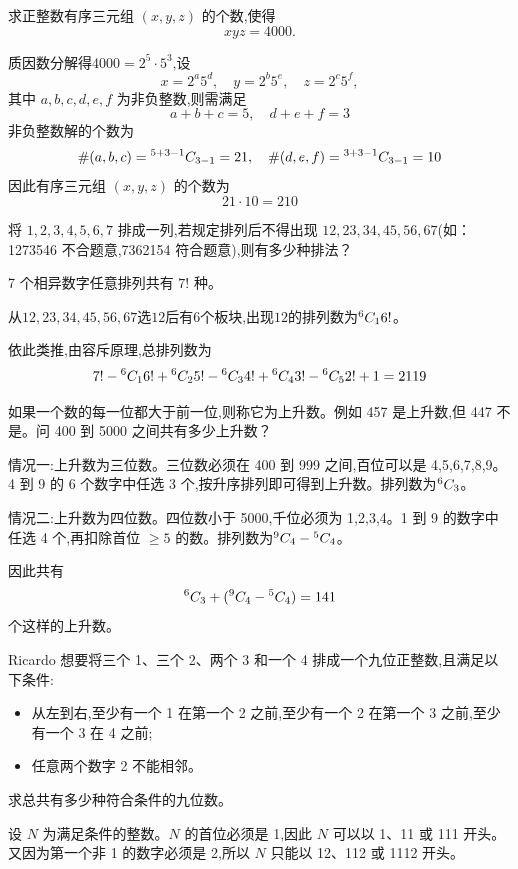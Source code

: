 \begin{questions}
    \question 求正整数有序三元组 $(x,y,z)$ 的个数,使得
    \[
    xyz = 4000.
    \]
    \begin{solution}
        质因数分解得$4000 = 2^5 \cdot 5^3$,设
        \[
        x = 2^a 5^d, \quad y = 2^b 5^e, \quad z = 2^c 5^f,
        \]
        其中 $a,b,c,d,e,f$ 为非负整数,则需满足
        \[
        a+b+c = 5, \quad d+e+f = 3
        \]
        非负整数解的个数为
        \[
        \#(a,b,c) = {}^{5+3-1}C_{3-1} = 21, \quad \#(d,e,f) = {}^{3+3-1}C_{3-1} = 10
        \]
        因此有序三元组 $(x,y,z)$ 的个数为
        \[
        21 \cdot 10 = 210
        \]
    \end{solution}

    \question 将 $1,2,3,4,5,6,7$ 排成一列,若规定排列后不得出现 $12,23,34,45,56,67$(如：1273546 不合题意,7362154 符合题意),则有多少种排法？
    \begin{solution}
    7 个相异数字任意排列共有 $7!$ 种。

    从$12,23,34,45,56,67$选$12$后有6个板块,出现$12$的排列数为${}^{6}C_{1}6!$。

    依此类推,由容斥原理,总排列数为
    \[
    7!-{}^{6}C_{1}6!+{}^{6}C_{2}5!-{}^{6}C_{3}4!+{}^{6}C_{4}3!-{}^{6}C_{5}2!+1=2119
    \]
    \end{solution}

    \question 如果一个数的每一位都大于前一位,则称它为上升数。例如 457 是上升数,但 447 不是。问 400 到 5000 之间共有多少上升数？
    \begin{solution}
        情况一:上升数为三位数。三位数必须在 400 到 999 之间,百位可以是 4,5,6,7,8,9。4 到 9 的 6 个数字中任选 3 个,按升序排列即可得到上升数。排列数为${}^{6}C_{3}$。

        情况二:上升数为四位数。四位数小于 5000,千位必须为 1,2,3,4。1 到 9 的数字中任选 4 个,再扣除首位 $\ge 5$ 的数。排列数为${}^{9}C_{4} - {}^{5}C_{4}$。

        因此共有 
        \[
        {}^{6}C_{3} + ({}^{9}C_{4} - {}^{5}C_{4}) = 141
        \]
        个这样的上升数。
    \end{solution}

    \question Ricardo 想要将三个 1、三个 2、两个 3 和一个 4 排成一个九位正整数,且满足以下条件:
    \begin{itemize}
        \item 从左到右,至少有一个 1 在第一个 2 之前,至少有一个 2 在第一个 3 之前,至少有一个 3 在 4 之前;
        \item 任意两个数字 2 不能相邻。
    \end{itemize}
    求总共有多少种符合条件的九位数。
    \begin{solution}
        设 $N$ 为满足条件的整数。$N$ 的首位必须是 1,因此 $N$ 可以以 1、11 或 111 开头。又因为第一个非 1 的数字必须是 2,所以 $N$ 只能以 12、112 或 1112 开头。
        

\end{solution}
\end{questions}
